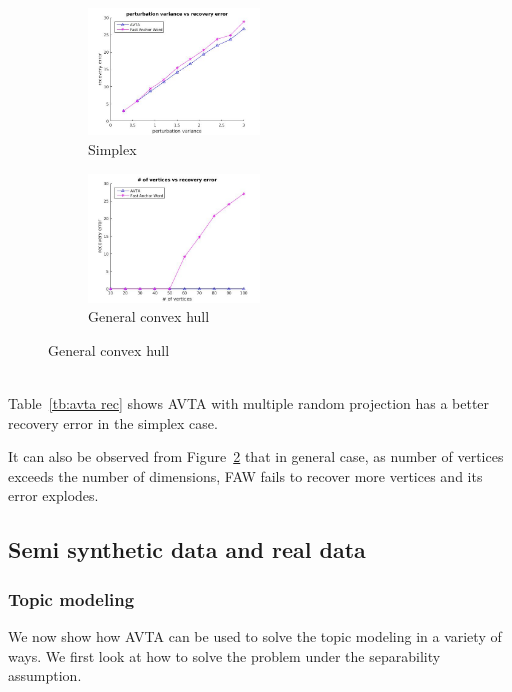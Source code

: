 \documentclass[]{article}
\begin{document}
	\begin{figure}[!h]
		\centering
		
		\begin{subfigure}{0.5\textwidth}
			\centering
			\includegraphics[width=0.5\textwidth]{AVTA_FAW_simplex}
			\caption{Simplex}
			\label{fig:avta rec}
		\end{subfigure}%
		\begin{subfigure}{0.5\textwidth}
			\centering
			\includegraphics[width=0.5\textwidth]{AVTA_FAW_Polytope}
			\caption{General convex hull}
			\label{fig:synthetic-error-general}
		\end{subfigure}%
		\label{fig: AVTA vs FAW}
	\end{figure}\\
	\noindent
	Table~\ref{tb:avta rec} shows AVTA with multiple random projection has a better recovery error in the simplex case. 
	
	\noindent It can also be observed from Figure~\ref{fig:synthetic-error-general} that in general case, as number of vertices exceeds the number of dimensions, FAW fails to recover more vertices and its error explodes.  
	
	\subsection{Semi synthetic data and real data}
	
	\subsubsection{Topic modeling}
	We now show how AVTA can be used to solve the topic modeling in a variety of ways. We first look at how to solve the problem under the separability assumption.
	
\end{document}
